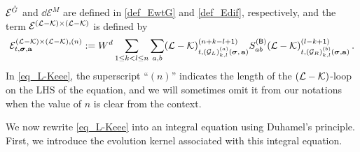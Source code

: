 $\mathcal{E}^{{\mathring G}}$ and $\dd\mathcal{E}^{M}$ are defined in \eqref{def_EwtG} and \eqref{def_Edif}, respectively, and the term $\mathcal{E}^{(\mathcal L-\mathcal K)\times (\mathcal L-\mathcal K)}$ is defined by 
\begin{equation}\label{def_ELKLK}
\mathcal{E}^{(\mathcal L-\mathcal K)\times (\mathcal L-\mathcal K),(n)}_{t, {\boldsymbol{\sigma}}, {\mathbf{a}}} :=
    W^d \sum_{1 \leq k < l \leq n} \sum_{a,b} 
   (\mathcal{L} - \mathcal{K})^{(n+k-l+1)}_{t, (\mathcal{G}_L)^{(a)}_{k, l}\left({\boldsymbol{\sigma}},\, {\mathbf{a}}\right)} 
  S^{({\mathsf{B}})}_{ab} (\mathcal L-\mathcal{K})^{(l-k+1)}_{t,(\mathcal{G}_R)^{(b)}_{k,l}\left({\boldsymbol{\sigma}} ,{\mathbf{a}}\right)}\,  .
\end{equation}
In \eqref{eq_L-Keee}, the superscript ``$(n)$'' indicates the length of the $(\mathcal L-\mathcal K)$-loop on the LHS of the equation, and we will sometimes omit it from our notations when the value of $n$ is clear from the context. 


We now rewrite \eqref{eq_L-Keee} into an integral equation using Duhamel's principle. First, we introduce the evolution kernel associated with this integral equation.


